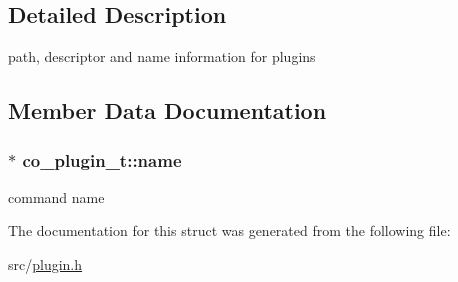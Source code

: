 \subsection{Detailed Description}
path, descriptor and name information for plugins 

\subsection{Member Data Documentation}
\hypertarget{structco__plugin__t_a6d404dac4735db73f208778f2eddd1e2}{
\subsubsection[{name}]{$\ast$ co\+\_\+plugin\+\_\+t\+::name}}\label{structco__plugin__t_a6d404dac4735db73f208778f2eddd1e2}
command name 

The documentation for this struct was generated from the following file\+:\begin{DoxyCompactItemize}
\item 
src/\hyperlink{plugin_8h}{plugin.\+h}\end{DoxyCompactItemize}
